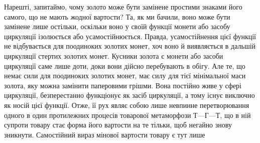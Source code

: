 Нарешті, запитаймо, чому золото може бути замінене простими
знаками його самого, що не мають жодної вартости? Та, як ми
бачили, воно може бути замінене лише остільки, оскільки воно
у своїй функції монети або засобу циркуляції ізолюється або
усамостійнюється. Правда, усамостійнення цієї функції не відбувається
для поодиноких золотих монет, хоч воно й виявляється
в дальшій циркуляції стертих золотих монет. Кусники золота
є монети або засоби циркуляції саме лише доти, доки вони дійсно
перебувають в обігу. Але те, що немає сили для поодиноких золотих
монет, має силу для тієї мінімальної маси золота, яку можна
замінити паперовими грішми. Вона постійно живе у сфері циркуляції,
безперестанно функціонує як засіб циркуляції, а тому
існує виключно як носій цієї функції. Отже, її рух являє собою
лише невпинне перетворювання одного в один протилежних процесів
товарової метаморфози $Т — Г — Т$, що в ній супроти товару
стає форма його вартости на те тільки, щоб негайно знову зникнути.
Самостійний вираз мінової вартости товару є тут лише
\parbreak{}  %
